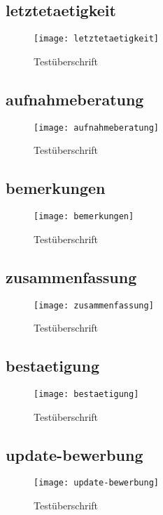 \begin{landscape}
\subsection{letztetaetigkeit}
\begin{figure}[H]
    \centering
    \caption{Testüberschrift}
    \begin{adjustbox}{width=\linewidth, center}
        \texttt{[image: letztetaetigkeit]}
    \end{adjustbox}
\end{figure}

\subsection{aufnahmeberatung}
\begin{figure}[H]
    \centering
    \caption{Testüberschrift}
    \begin{adjustbox}{width=\linewidth, center}
        \texttt{[image: aufnahmeberatung]}
    \end{adjustbox}
\end{figure}

\subsection{bemerkungen}
\begin{figure}[H]
    \centering
    \caption{Testüberschrift}
    \begin{adjustbox}{width=\linewidth, center}
        \texttt{[image: bemerkungen]}
    \end{adjustbox}
\end{figure}

\subsection{zusammenfassung}
\begin{figure}[H]
    \centering
    \caption{Testüberschrift}
    \begin{adjustbox}{width=\linewidth, center}
        \texttt{[image: zusammenfassung]}
    \end{adjustbox}
\end{figure}

\subsection{bestaetigung}
\begin{figure}[H]
    \centering
    \caption{Testüberschrift}
    \begin{adjustbox}{width=\linewidth, center}
        \texttt{[image: bestaetigung]}
    \end{adjustbox}
\end{figure}

\subsection{update-bewerbung}
\begin{figure}[H]
    \centering
    \caption{Testüberschrift}
    \begin{adjustbox}{width=\linewidth, center}
        \texttt{[image: update-bewerbung]}
    \end{adjustbox}
\end{figure}

\end{landscape}
